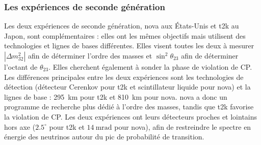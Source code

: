 
      \subsubsection{Les expériences de seconde génération}

        Les deux expériences de seconde génération, \gls{nova} aux États-Unis et \gls{t2k} au Japon, sont complémentaires : elles ont les mêmes objectifs mais utilisent des technologies et lignes de bases différentes.  Elles visent toutes les deux à mesurer $|\Delta m_{32}^2|$ afin de déterminer l'ordre des masses et $\sin^2{\theta_{23}}$ afin de déterminer l'octant de $\theta_{23}$. Elles cherchent également à sonder la phase de violation de CP. Les différences principales entre les deux expériences sont les technologies de détection (détecteur Cerenkov pour \gls{t2k} et scintillateur liquide pour \gls{nova}) et la lignes de base : \SI{295}{\kilo\meter} pour \gls{t2k} et \SI{810}{\kilo\meter} pour \gls{nova}. \gls{nova} a donc un programme de recherche plus dédié à l'ordre des masses, tandis que \gls{t2k} favorise la violation de CP. Les deux expériences ont leurs détecteurs proches et lointains hors axe ($2.5^{\circ}$ pour \gls{t2k} et $\SI{14}{\milli\radian}$ pour \gls{nova}), afin de restreindre le spectre en énergie des neutrinos autour du pic de probabilité de transition.
        
